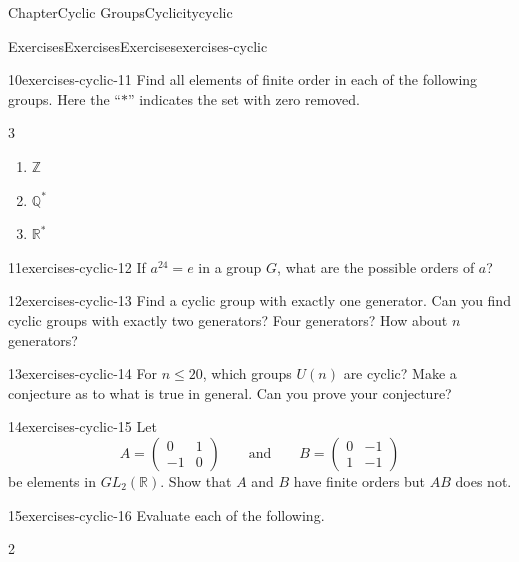\documentclass[oneside,10pt,]{book}
\numberwithin{equation}{section}
\begin{document}
\begin{chapterptx}{Chapter}{Cyclic Groups}{}{Cyclicity}{}{}{cyclic}
\begin{exercises-section}{Exercises}{Exercises}{}{Exercises}{}{}{exercises-cyclic}
\begin{divisionexercise}{10}{}{}{exercises-cyclic-11}%
Find all elements of finite order in each of the following groups. Here the ``\(\ast\)'' indicates the set with zero removed.%
%
\begin{multicols}{3}
\begin{enumerate}[label={(\alph*)}]
\item{}\(\displaystyle {\mathbb Z}\)%
\item{}\(\displaystyle {\mathbb Q}^\ast\)%
\item{}\(\displaystyle {\mathbb R}^\ast\)%
\end{enumerate}
\end{multicols}
\end{divisionexercise}%
\begin{divisionexercise}{11}{}{}{exercises-cyclic-12}%
If \(a^{24} =e\) in a group \(G\), what are the possible orders of \(a\)?%
\end{divisionexercise}%
\begin{divisionexercise}{12}{}{}{exercises-cyclic-13}%
Find a cyclic group with exactly one generator. Can you find cyclic groups with exactly two generators? Four generators? How about \(n\) generators?%
\end{divisionexercise}%
\begin{divisionexercise}{13}{}{}{exercises-cyclic-14}%
For \(n \leq 20\), which groups \(U(n)\) are cyclic?  Make a conjecture as to what is true in general.  Can you prove your conjecture?%
\end{divisionexercise}%
\begin{divisionexercise}{14}{}{}{exercises-cyclic-15}%
Let%
\begin{equation*}
A =
\begin{pmatrix}
0 & 1 \\
-1 & 0
\end{pmatrix}
\qquad \text{and} \qquad
B =
\begin{pmatrix}
0 & -1 \\
1 & -1
\end{pmatrix}
\end{equation*}
be elements in \(GL_2( {\mathbb R} )\). Show that \(A\) and \(B\) have finite orders but \(AB\) does not.%
\end{divisionexercise}%
\begin{divisionexercise}{15}{}{}{exercises-cyclic-16}%
Evaluate each of the following.%
%
\begin{multicols}{2}
\begin{enumerate}[label={(\alph*)}]

\end{enumerate}
\end{multicols}
\end{divisionexercise}
\end{exercises-section}
\end{chapterptx}
\end{document}
